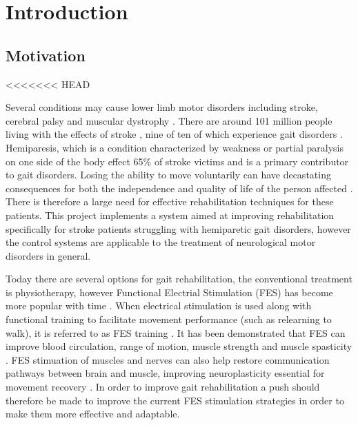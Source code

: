 
\section{Introduction }


\subsection{Motivation}
<<<<<<< HEAD

Several conditions may cause lower limb motor disorders including stroke, cerebral palsy and muscular dystrophy \cite{hayami_development_2022}. There are around 101 million people living with the effects of stroke \cite{noauthor_key_nodate}, nine of ten of which experience gait disorders \cite{schaechter_motor_2004}. Hemiparesis, which is a condition characterized by weakness or partial paralysis on one side of the body effect 65\% of stroke victims \cite{wist_muscle_2016} and is a primary contributor to gait disorders. Losing the ability to move voluntarily can have decastating consequences for both the independence and quality of life of the person affected \cite{marquez-chin_functional_2020}. There is therefore a large need for effective rehabilitation techniques for these patients. This project implements a system aimed at improving rehabilitation specifically for stroke patients struggling with hemiparetic gait disorders, however the control systems are applicable to the treatment of neurological motor disorders in general.

Today there are several options for gait rehabilitation, the conventional treatment is physiotherapy, however Functional Electrial Stimulation (FES) has become more popular with time \cite{muller_adaptive_2020}. When electrical stimulation is used along with functional training to facilitate movement performance (such as relearning to walk), it is referred to as FES training \cite{hayami_development_2022}. It has been demonstrated that FES can improve blood circulation, range of motion, muscle strength and muscle spasticity \cite{luo_review_2020}. FES stimuation of muscles and nerves can also help restore communication pathways between brain and muscle, improving neuroplasticity essential for movement recovery \cite{marquez-chin_functional_2020}. In order to improve gait rehabilitation a push should therefore be made to improve the current FES stimulation strategies in order to make them more effective and adaptable.

